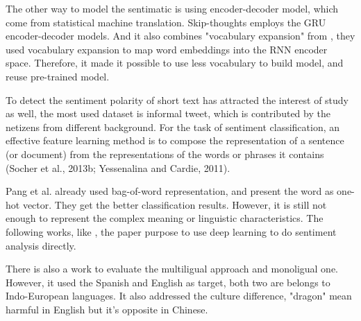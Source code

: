 The other way to model the sentimatic is using encoder-decoder model, which come from statistical machine translation. Skip-thoughts\cite{kiros2015skip} employs the GRU encoder-decoder models.
And it also combines "vocabulary expansion" from \cite{MikolovLS13}, they used vocabulary expansion to map word embeddings into the RNN encoder space.
Therefore, it made it possible to use less vocabulary to build model, and reuse pre-trained model.

To detect the sentiment polarity of short text has attracted the interest of study as well, the most used dataset is informal tweet, which is contributed by the netizens from different background. 
For the task of sentiment classification, an effective feature learning method is to compose the representation of a
sentence (or document) from the representations of the words or phrases it contains (Socher et al., 2013b; Yessenalina and Cardie, 2011).

Pang et al. \cite{pang2002thumbs} already used bag-of-word representation, and present the word as one-hot vector. They get the better classification results. However, it is still not enough to represent the complex meaning or linguistic characteristics.
The following works, like \cite{tang2014learning}, the paper purpose to use deep learning to do sentiment analysis directly.

There is also a work\cite{multilingual} to evaluate the multiligual approach and monoligual one. However, it used the Spanish and English as target, both two are belongs 
to Indo-European languages. It also addressed the culture difference, "dragon" mean harmful in English but it's opposite in Chinese. 
